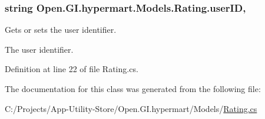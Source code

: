 \subsubsection[{user\+I\+D}]{\setlength{\rightskip}{0pt plus 5cm}string Open.\+G\+I.\+hypermart.\+Models.\+Rating.\+user\+I\+D\hspace{0.3cm}{\ttfamily [get]}, {\ttfamily [set]}}\label{class_open_1_1_g_i_1_1hypermart_1_1_models_1_1_rating_a1e8a569cc68356a222db0eee305273f2}


Gets or sets the user identifier. 

The user identifier. 

Definition at line 22 of file Rating.\+cs.



The documentation for this class was generated from the following file\+:\begin{DoxyCompactItemize}
\item 
C\+:/\+Projects/\+App-\/\+Utility-\/\+Store/\+Open.\+G\+I.\+hypermart/\+Models/\hyperlink{_rating_8cs}{Rating.\+cs}\end{DoxyCompactItemize}
